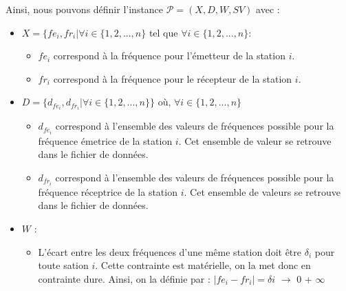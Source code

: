 \documentclass[a4paper, 10pt]{article}
\begin{document}
      Ainsi, nous pouvons définir l'instance $\mathcal{P} = (X, D, W, SV)$ avec :
      \begin{itemize}
        \item $X = \{ fe_i, fr_i | \forall i \in \{1,2,...,n\}$ tel que $\forall i \in \{1,2,...,n\}$:
              \begin{itemize}
                \item $fe_{i}$ correspond à la fréquence pour l'émetteur de la station $i$.
                \item $fr_{i}$ correspond à la fréquence pour le récepteur de la station $i$.
              \end{itemize}
        \item $D = \{d_{fe_i}, d_{fr_i} | \forall i \in \{1,2,...,n\} \}$ où, $\forall i \in \{1,2,...,n\}$
              \begin{itemize}
                \item $d_{fe_i}$ correspond à l'ensemble des valeurs de fréquences possible pour la fréquence émetrice de la station $i$. Cet ensemble de valeur se retrouve dans le fichier de données.
                \item $d_{fr_i}$ correspond à l'ensemble des valeurs de fréquences possible pour la fréquence réceptrice de la station $i$. Cet ensemble de valeurs se retrouve dans le fichier de données.
              \end{itemize}
        \item $W$ :
              \begin{itemize}
                \item L'écart entre les deux fréquences d'une même station doit être $\delta_{i}$ pour toute sation $i$. Cette contrainte est matérielle, on la met donc en contrainte dure. Ainsi, on la définie par :
                 $| fe_{i} - fr_{i} | = \delta{i}$ $\rightarrow$ \color{green} 0 \color{red} + $\infty$ \color{black}


\end{itemize}
\end{itemize}
\end{document}
